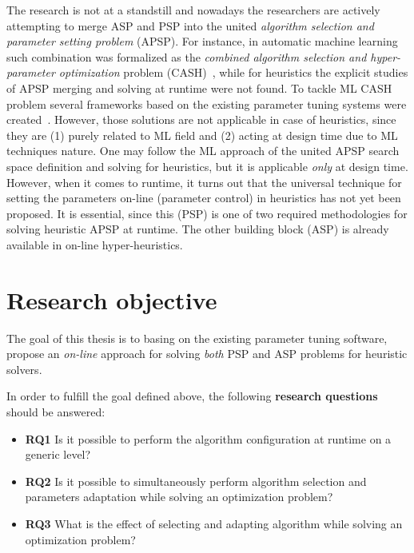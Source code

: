 The research is not at a standstill and nowadays the researchers are actively attempting to merge ASP and PSP into the united \emph{algorithm selection and parameter setting problem} (APSP). For instance, in automatic machine learning such combination was formalized as the \emph{combined algorithm selection and hyper-parameter optimization} problem (CASH)~\cite{thornton2013auto}, while for heuristics the explicit studies of APSP merging and solving at runtime were not found. To tackle ML CASH problem several frameworks based on the existing parameter tuning systems were created~\cite{thornton2013auto,feurer2015efficient,olson2019tpot}. However, those solutions are not applicable in case of heuristics, since they are (1) purely related to ML field and (2) acting at design time due to ML techniques nature. One may follow the ML approach of the united APSP search space definition and solving for heuristics, but it is applicable \emph{only} at design time. However, when it comes to runtime, it turns out that the universal technique for setting the parameters on-line (parameter control) in heuristics has not yet been proposed. It is essential, since this (PSP) is one of two required methodologies for solving heuristic APSP at runtime. The other building block (ASP) is already available in on-line hyper-heuristics.

\section{Research objective}\label{intro: research objective}
The goal of this thesis is to basing on the existing parameter tuning software, propose an \emph{on-line} approach for solving \emph{both} PSP and ASP problems for heuristic solvers.

In order to fulfill the goal defined above, the following \textbf{research questions} should be answered:
\begin{itemize}
	\item \textbf{RQ1} Is it possible to perform the algorithm configuration at runtime on a generic level?
	
	\item \textbf{RQ2} Is it possible to simultaneously perform algorithm selection and parameters adaptation while solving an optimization problem?
	
	\item \textbf{RQ3} What is the effect of selecting and adapting algorithm while solving an optimization problem?
\end{itemize}


